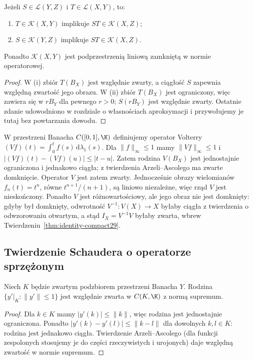 \begin{twierdzenie}
\label{thm:ideal-compact29}
Jeżeli $S\in\mathcal L(Y,Z)$ i $T\in\mathcal L(X,Y)$, to:
\begin{enumerate}[label=\textup{(\roman*)}]
\item $T\in\mathcal K(X,Y)$ implikuje
      $ST\in\mathcal K(X,Z)$;
\item $S\in\mathcal K(Y,Z)$ implikuje
      $ST\in\mathcal K(X,Z)$.
\end{enumerate}
Ponadto $\mathcal K(X,Y)$ jest podprzestrzenią liniową zamkniętą
w normie operatorowej.
\end{twierdzenie}
\begin{proof}
W (i) zbiór $T(B_X)$ jest względnie zwarty, a ciągłość $S$
zapewnia względną zwartość jego obrazu. W (ii) zbiór $T(B_X)$
jest ograniczony, więc zawiera się w $rB_Y$ dla pewnego $r>0$;
$S(rB_Y)$ jest względnie zwarty. Ostatnie zdanie udowodniono
w rozdziale o własnościach aproksymacji i przywołujemy je tutaj
bez powtarzania dowodu.
\end{proof}

\begin{przyklad}
\label{ex:volterra29}
W przestrzeni Banacha $C([0,1],\K)$ definiujemy operator Volterry
$(Vf)(t)=\int_{0}^{t}f(s)\,\mathrm d\lambda_1(s)$.
Dla $\|f\|_\infty\le1$ mamy $\|Vf\|_\infty\le1$ i
$|(Vf)(t)-(Vf)(u)|\le|t-u|$. Zatem rodzina $V(B_X)$
jest jednostajnie ograniczona i jednakowo ciągła;
z twierdzenia Arzeli--Ascolego ma zwarte domknięcie.
Operator $V$ jest zatem zwarty. Jednocześnie obrazy wielomianów
$f_n(t)=t^n$, równe $t^{n+1}/(n+1)$, są liniowo niezależne,
więc rząd $V$ jest nieskończony. Ponadto $V$ jest różnowartościowy,
ale jego obraz nie jest domknięty: gdyby był domknięty, odwrotność
$V^{-1}:V(X)\to X$ byłaby ciągła z twierdzenia o odwzorowaniu
otwartym, a stąd $I_X=V^{-1}V$ byłaby zwarta, wbrew
Twierdzeniu~\ref{thm:identity-compact29}.
\end{przyklad}

\subsection{Twierdzenie Schaudera o operatorze sprzężonym}

\begin{lemat}
\label{lem:restrictions29}
Niech $K$ będzie zwartym podzbiorem przestrzeni Banacha $Y$.
Rodzina $\{y'|_K:\|y'\|\le1\}$ jest względnie zwarta
w $C(K,\K)$ z normą supremum.
\end{lemat}
\begin{proof}
Dla $k\in K$ mamy $|y'(k)|\le\|k\|$, więc rodzina jest
jednostajnie ograniczona. Ponadto
$|y'(k)-y'(l)|\le\|k-l\|$ dla dowolnych $k,l\in K$:
rodzina jest jednakowo ciągła. Twierdzenie Arzeli--Ascolego
(dla funkcji zespolonych stosujemy je do części rzeczywistych
i urojonych) daje względną zwartość w normie supremum.
\end{proof}

